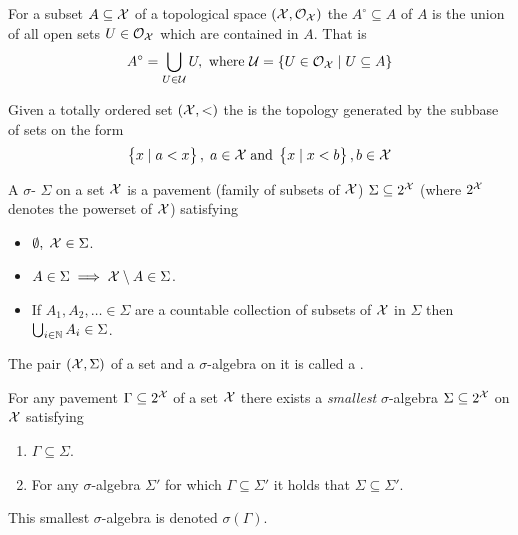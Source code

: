 
\begin{defn}[Interior]
  For a subset $A \subseteq \mathcal{X}$
  of a topological space $(\mathcal{X}, \mathcal{O}_\mathcal{X})$
  the  $A^\circ \subseteq A$ of $A$ is the
  union of all open sets $U \in \mathcal{O}_\mathcal{X}$ which are contained in $A$.
  That is
  \[A^\circ = \bigcup_{U \in \mathcal{U}} U, \text{ where } \mathcal{U}
  = \left\{ U \in \mathcal{O}_\mathcal{X} \;\middle\vert\; U \subseteq A \right\}\]
  \label{defn:interior}
\end{defn}

\begin{defn}
  Given a totally ordered set $(\mathcal{X}, <)$ the 
  is the topology generated by the subbase of sets on the form
  \[ \left\{ x \mid a < x \right\},\; a \in \mathcal{X}\; \mathrm{and} \;
  \left\{ x \mid x < b \right\}, b \in \mathcal{X} \]
  \label{defn:orderTop}
\end{defn}

\begin{defn}
  A $\sigma$- $\Sigma$ on a set $\mathcal{X}$ is a pavement (family of
  subsets of $\mathcal{X}$) $\Sigma \subseteq 2^\mathcal{X}$ (where $2^\mathcal{X}$ denotes the
  powerset of $\mathcal{X}$) satisfying
  \begin{itemize}
    \item $\emptyset,\; \mathcal{X} \in \Sigma$.
    \item $A \in \Sigma \implies \mathcal{X} \setminus A \in \Sigma$.
    \item If $A_1, A_2, \dots \in \Sigma$
      are a countable collection of subsets of $\mathcal{X}$
      in $\Sigma$ then $\bigcup_{i \in \mathbb{N}} A_i \in \Sigma$.
  \end{itemize}
  The pair $(\mathcal{X}, \Sigma)$ of a set and a $\sigma$-algebra on it is
  called a .
  \label{defn:sigmaAlg}
\end{defn}

\begin{thm}
  For any pavement $\Gamma \subseteq 2^\mathcal{X}$ of a set $\mathcal{X}$ there exists
  a \emph{smallest} $\sigma$-algebra $\Sigma \subseteq 2^\mathcal{X}$ on $\mathcal{X}$
  satisfying
  \begin{enumerate}
    \item $\Gamma \subseteq \Sigma$.
    \item For any $\sigma$-algebra $\Sigma'$ for which $\Gamma \subseteq \Sigma'$
      it holds that $\Sigma \subseteq \Sigma'$.
  \end{enumerate}
  This smallest $\sigma$-algebra is denoted $\sigma(\Gamma)$.
\end{thm}

